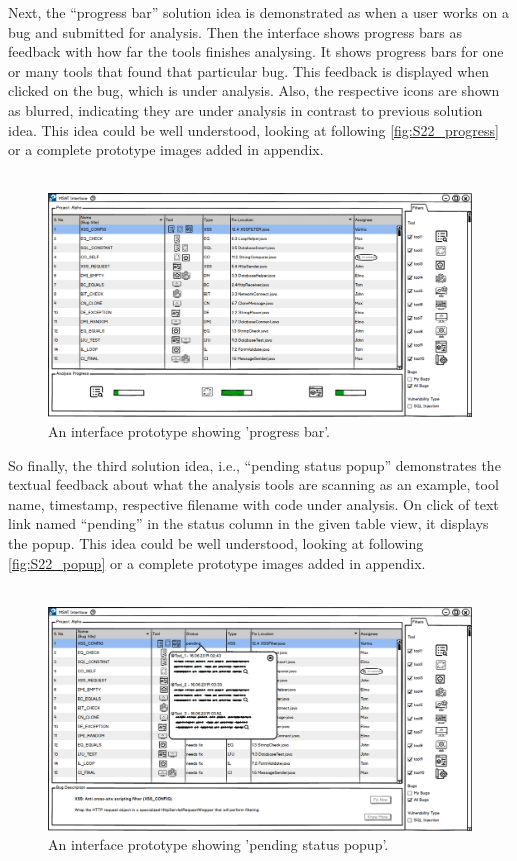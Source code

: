 Next, the “progress bar” solution idea is demonstrated as when a user works on a bug and submitted for analysis. Then the interface shows progress bars as feedback with how far the tools finishes analysing. It shows progress bars for one or many tools that found that particular bug. This feedback is displayed when clicked on the bug, which is under analysis. Also, the respective icons are shown as blurred, indicating they are under analysis in contrast to previous solution idea. This idea could be well understood, looking at following \autoref{fig:S22_progress} or a complete prototype images added in appendix.  \\ \\


\begin{figure}[hbt!]
	\centering
	\includegraphics[width=\linewidth]{figures/solution_ideas_snaps/S22_progress}
	\caption{An interface prototype showing 'progress bar'.}
	\label{fig:S22_progress}
\end{figure}


So finally, the third solution idea, i.e., “pending status popup” demonstrates the textual feedback about what the analysis tools are scanning as an example, tool name, timestamp, respective filename with code under analysis. On click of text link named “pending” in the status column in the given table view, it displays the popup. This idea could be well understood, looking at following \autoref{fig:S22_popup} or a complete prototype images added in appendix. \\ \\


\begin{figure}[hbt!]
	\centering
	\includegraphics[width=\linewidth]{figures/solution_ideas_snaps/S22_popup}
	\caption{An interface prototype showing 'pending status popup'.}
	\label{fig:S22_popup}
\end{figure}

